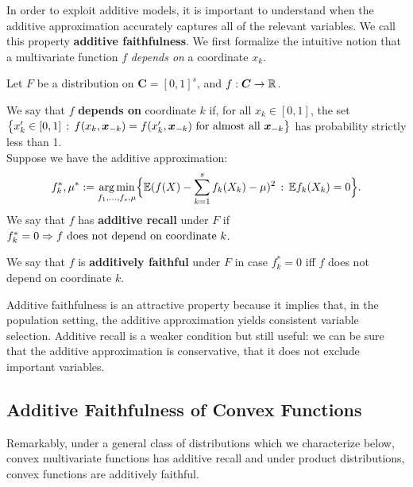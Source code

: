 In order to exploit additive models, it is important to understand when the
additive approximation accurately captures all of the relevant variables.
We call this property \textbf{additive faithfulness}. We first formalize the intuitive notion that a multivariate function $f$ \emph{depends on} a coordinate $x_k$.

\begin{definition}
  Let $F$ be a distribution on $\mathbf{C}=[0,1]^s$, and $f:\mbox{\boldmath $C$}\rightarrow {\mathbb R}$. 
  
We say that $f$ \textbf{depends on} coordinate $k$ if, for all $x_k \in [0,1]$, the set 
$\big\{ x'_k \in [0, 1] \,:\, f(x_k, \mbox{\boldmath $x$}_{-k}) = f(x'_k, \mbox{\boldmath $x$}_{-k}) 
\textrm{ for almost all  $\mbox{\boldmath $x$}_{-k}$} \big\}$ 
has probability strictly less than 1.\\

Suppose we have the additive approximation:
\begin{equation}
f_k^*, \mu^* := \mathop{\text{\rm arg\,min}}_{f_1,\ldots, f_s, \mu} \Bigl\{ 
             {\mathbb E} ( f(X) - \sum_{k=1}^s f_k(X_k) -\mu )^2 
         \,:\, {\mathbb E} f_k(X_k) = 0 \Bigr\}.
\end{equation}
We say that $f$ has \textbf{additive recall} under $F$ if $f^*_k = 0 \Rightarrow \textrm{$f$ does not depend on coordinate $k$}$. 

We say that $f$ is \textbf{additively faithful} under $F$ in case $f^*_k = 0$ iff $f$ does not depend on coordinate $k$. 
\end{definition}

Additive faithfulness is an attractive property because it implies that, in the population setting, the additive approximation yields consistent variable selection. Additive recall is a weaker condition but still useful: we can be sure that the additive approximation is conservative, that it does not exclude important variables.

\subsection{Additive Faithfulness of Convex Functions}

Remarkably, under a general class of distributions which we characterize below, convex multivariate functions has additive recall and under product distributions, convex functions are additively faithful.

